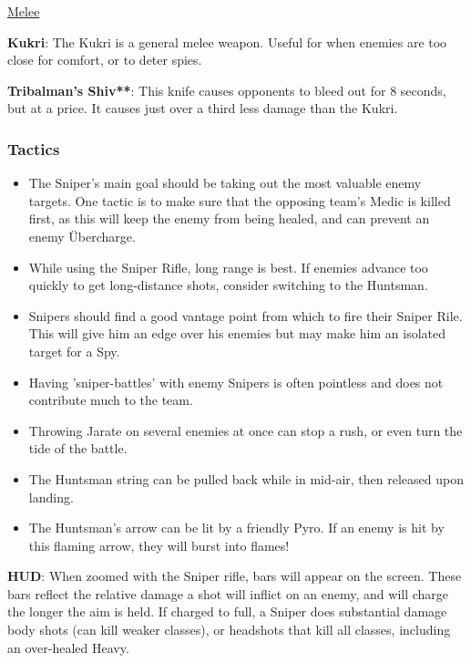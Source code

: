 \begin {center}
\underline {Melee}
\end {center}

{\bf Kukri}: The Kukri is a general melee weapon. Useful for when enemies are too close for comfort, or to deter spies.

{\bf Tribalman's Shiv**}: This knife causes opponents to bleed out for 8 seconds, but at a price. It causes just over a third less damage than the Kukri.

\subsubsection {Tactics}
\begin {itemize}

\item The Sniper's main goal should be taking out the most valuable enemy targets. One tactic is to make sure that the opposing team's Medic is killed first, as this will keep the enemy from being healed, and can prevent an enemy Übercharge.

\item While using the Sniper Rifle, long range is best. If enemies advance too quickly to get long-distance shots, consider switching to the Huntsman.

\item Snipers should find a good vantage point from which to fire their Sniper Rile. This will give him an edge over his enemies but may make him an isolated target for a Spy.

\item Having 'sniper-battles' with enemy Snipers is often pointless and does not contribute much to the team.

\item Throwing Jarate on several enemies at once can stop a rush, or even turn the tide of the battle.

\item The Huntsman string can be pulled back while in mid-air, then released upon landing.

\item The Huntsman's arrow can be lit by a friendly Pyro. If an enemy is hit by this flaming arrow, they will burst into flames!
\end {itemize}

{\bf HUD}: When zoomed with the Sniper rifle, bars will appear on the screen. These bars reflect the relative damage a shot will inflict on an enemy, and will charge the longer the aim is held. If charged to full, a Sniper does substantial damage body shots (can kill weaker classes), or headshots that kill all classes, including an over-healed Heavy.